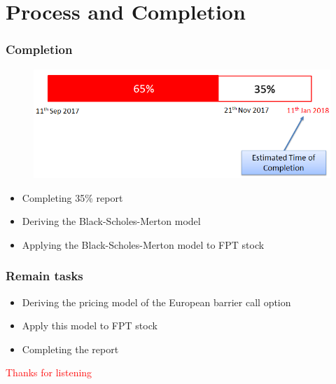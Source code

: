\documentclass{beamer}
\begin{document}
\section{Process and Completion}
\begin{frame}
\frametitle{Completion}
	\begin{figure}[htp]
		\begin{center}
			\includegraphics[scale=0.5]{fig4}
		\end{center}
		\label{reffig4}
	\end{figure} \pause
\begin{itemize}
	\item Completing 35\% report
	\item Deriving the Black-Scholes-Merton model
	\item Applying the Black-Scholes-Merton model to FPT stock
\end{itemize}
\end{frame}
\begin{frame}
	\frametitle{Remain tasks}
	\begin{itemize}
		\item Deriving the pricing model of the European barrier call option \\ [0.3cm]
		\item Apply this model to FPT stock \\ [0.3cm]
		\item Completing the report
	\end{itemize}
	
\end{frame}
\begin{frame}
\Huge{\centerline{\textcolor{red}{Thanks for listening}}}
\end{frame}
\end{document}
